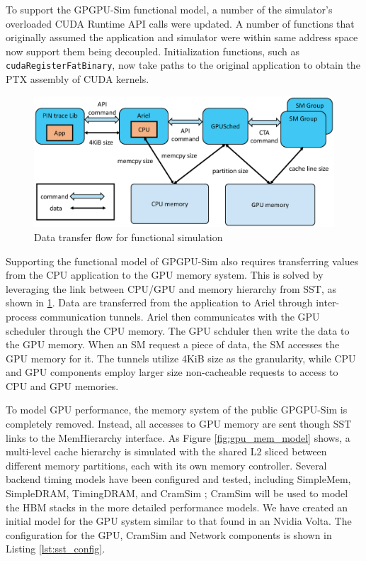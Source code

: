 To support the GPGPU-Sim functional model, a number of the simulator's overloaded
CUDA Runtime API calls were updated. A number of functions that originally assumed
the application and simulator were within same address space now support them being
decoupled. Initialization functions, such as \texttt{\textunderscore \textunderscore
cudaRegisterFatBinary}, now take paths to the original application to obtain the PTX
assembly of CUDA kernels.


   \begin{figure}[!htb]
      \centering
      \setlength{\abovecaptionskip}{6pt plus 1pt minus 1pt}
      \includegraphics[width=.90\textwidth,keepaspectratio]{figures/transfer_flow.eps}
      \captionsetup{width=.75\textwidth}
      \caption{Data transfer flow for functional simulation}
      \label{fig:gpu_transfer_model}
   \end{figure}

Supporting the functional model of GPGPU-Sim also requires transferring values
from the CPU application to the GPU memory system. This is solved by leveraging
the link between CPU/GPU and memory hierarchy from SST, as shown in
\ref{fig:gpu_transfer_model}. Data are transferred from the application to Ariel through
inter-process communication tunnels. Ariel then communicates with the GPU scheduler through
the CPU memory. The GPU schduler then write the data to the GPU memory. When an SM
request a piece of data, the SM accesses the GPU memory for it.
The tunnels utilize 4KiB size as the granularity, while CPU and GPU components
employ larger size non-cacheable requests to access to CPU and GPU memories.

To model GPU performance, the memory system of the public GPGPU-Sim is
completely removed. Instead, all accesses to GPU memory are sent though SST
links to the MemHierarchy interface. As Figure \ref{fig:gpu_mem_model} shows, a
multi-level cache hierarchy is simulated with the shared L2 sliced between
different memory partitions, each with its own memory controller. Several
backend timing models have been configured and tested, including SimpleMem,
SimpleDRAM, TimingDRAM, and CramSim \cite{healy2017}; CramSim will be used to
model the HBM stacks in the more detailed performance models. We have created an
initial model for the GPU system similar to that found in an Nvidia Volta. The
configuration for the GPU, CramSim and Network components is shown in Listing
\ref{lst:sst_config}.


